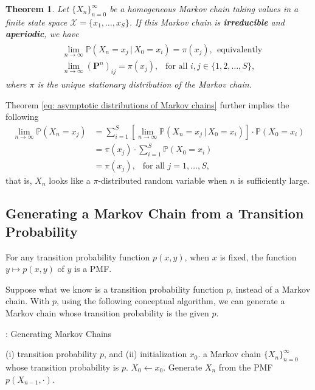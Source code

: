 \documentclass[11pt,letterpaper, leqno]{article}
\newtheorem{theorem}{Theorem}
\numberwithin{equation}{section}
\numberwithin{theorem}{section}
\numberwithin{lemma}{section}
\numberwithin{corollary}{section}
\numberwithin{definition}{section}
\numberwithin{proposition}{section}
\numberwithin{remark}{section}
\numberwithin{example}{section}
\begin{document}
\begin{theorem}\label{thm: asymptotic distributions of MCs}
Let $\{X_n\}_{n=0}^\infty$ be a homogeneous Markov chain taking values in a finite state space $\mathcal{X}=\{x_1,\ldots,x_S\}$. If this Markov chain is \textbf{irreducible} and \textbf{aperiodic}, we have 
\begin{align}\label{eq: asymptotic distributions of Markov chains}
    \begin{aligned}
    & \lim_{n\rightarrow\infty}\mathbb{P}(X_n=x_j \,\vert\, X_0=x_i)=\pi(x_j),\ \ \mbox{equivalently} \\
    & \lim_{n\rightarrow\infty} (\boldsymbol{P}^n)_{ij}=\pi(x_j),\ \ \mbox{ for all }i,j\in\{1,2,\ldots,S\},
    \end{aligned}
\end{align}
where $\pi$ is the unique stationary distribution of the Markov chain.
\end{theorem}
\noindent Theorem \ref{eq: asymptotic distributions of Markov chains} further implies the following
\begin{align*}
    \lim_{n\rightarrow\infty}\mathbb{P}(X_n=x_j) 
    & =\sum_{i=1}^S \left[\lim_{n\rightarrow\infty}\mathbb{P}(X_n=x_j \,\vert\, X_0=x_i)\right]\cdot \mathbb{P}(X_0=x_i) \\
    & = \pi(x_j) \cdot \sum_{i=1}^S \mathbb{P}(X_0=x_i) \\
    & = \pi(x_j),\ \ \mbox{ for all }j=1,\ldots,S,
\end{align*}
that is, $X_n$ looks like a $\pi$-distributed random variable when $n$ is sufficiently large.

\subsection{Generating a Markov Chain from a Transition Probability}

For any transition probability function $p(x,y)$, when $x$ is fixed, the function $y\mapsto p(x,y)$ of $y$ is a PMF.

Suppose what we know is a transition probability function $p$, instead of a Markov chain. With $p$, using the following conceptual algorithm, we can generate a Markov chain whose transition probability is the given $p$.
\begin{algorithm}
\caption{: Generating Markov Chains}\label{algorithm: generating MCs with knowing how to deal with transition probability}
\begin{algorithmic}[1]
    \INPUT (i) transition probability $p$, and (ii) initialization $x_0$.
    \OUTPUT a Markov chain $\{X_n\}_{n=0}^\infty$ whose transition probability is $p$.
    \STATE $X_0\leftarrow x_0$.
    \STATE Generate $X_{n}$ from the PMF $p(X_{n-1},\cdot)$.
    \ENDFOR
\end{algorithmic}
\end{algorithm}
\end{document}
